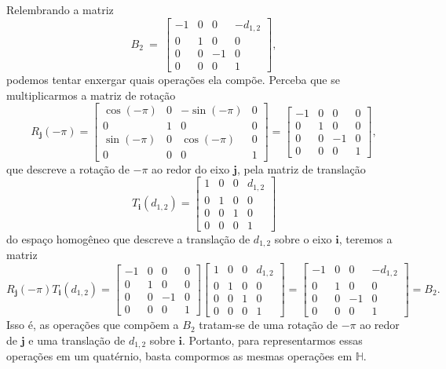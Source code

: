 \documentclass[a4paper,12pt]{report}
\theoremstyle{plain}
\theoremstyle{definition}
\begin{document}
	Relembrando a matriz	
	$$B_2\: =\:
	\begin{bmatrix}
		-1 & 0 & 0 & -d_{1,2}\\
		0 & 1 & 0 & 0\\ 
		0 & 0 & -1 & 0\\ 
		0 & 0 & 0 & 1
	\end{bmatrix},$$
	podemos tentar enxergar quais operações ela compõe. Perceba que se multiplicarmos a matriz de rotação 
	$$R_{\mathbf j}(-\pi) =
	\begin{bmatrix}
		\cos(-\pi)&0 & -\sin(-\pi)& 0\\
		0 & 1 & 0& 0\\
		\sin(-\pi) & 0&\cos(-\pi)& 0\\
		0 & 0& 0& 1
	\end{bmatrix} = 
	\begin{bmatrix}
		-1&0 & 0& 0\\
		0 & 1 & 0& 0\\
		0 & 0&-1& 0\\
		0 & 0& 0& 1
	\end{bmatrix},
	$$
	que descreve a rotação de $-\pi$ ao redor do eixo $\mathbf j$, pela matriz de translação
	$$	
	T_{\mathbf i}(d_{1,2}) =
	\begin{bmatrix}
		1&0 & 0& d_{1,2}\\
		0 & 1 & 0& 0\\
		0 & 0&1& 0\\
		0 & 0& 0& 1
	\end{bmatrix}
	$$
	do espaço homogêneo que descreve a translação de $d_{1,2}$ sobre o eixo $\mathbf i$, teremos a matriz
	$$
	R_{\mathbf j}(-\pi)T_{\mathbf i}(d_{1,2}) = 
	\begin{bmatrix}
		-1&0 & 0& 0\\
		0 & 1 & 0& 0\\
		0 & 0&-1& 0\\
		0 & 0& 0& 1
	\end{bmatrix}
	\begin{bmatrix}
		1&0 & 0& d_{1,2}\\
		0 & 1 & 0& 0\\
		0 & 0&1& 0\\
		0 & 0& 0& 1
	\end{bmatrix}
	=
	\begin{bmatrix}
		-1 & 0 & 0 & -d_{1,2}\\
		0 & 1 & 0 & 0\\ 
		0 & 0 & -1 & 0\\ 
		0 & 0 & 0 & 1
	\end{bmatrix} = B_2.
	$$
	Isso é, as operações que compõem a $B_2$ tratam-se de uma rotação de $-\pi$ ao redor de $\mathbf j$ e uma translação de $d_{1,2}$ sobre $\mathbf i$. Portanto, para representarmos essas operações em um quatérnio, basta compormos as mesmas operações em $\mathbb{H}$.
	\\
	
\end{document}
